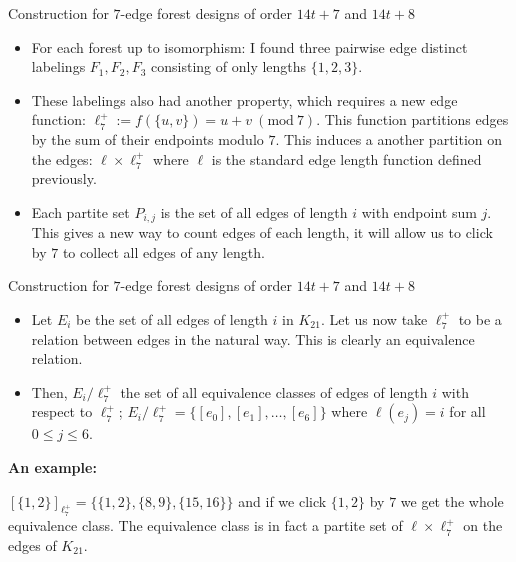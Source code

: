 \documentclass{beamer}
\theoremstyle{plain}
\newcommand{\Mod}[1]{\ (\mathrm{mod}\ #1)}
\begin{document}
    \begin{frame}{Construction for $7$-edge forest designs of order $14t+7$ and $14t+8$}

        \begin{itemize} 

        \item For each forest up to isomorphism: I found three pairwise edge distinct labelings $F_{1},F_{2},F_{3}$ consisting of only lengths $\{1,2,3\}$.
        \item These labelings also had another property, which requires a new edge function: $\ell^{+}_{7}:= f(\{u,v\})= u+v \Mod{7}$. This function partitions edges by the sum of their endpoints modulo $7$. This induces a another partition on the edges: $\ell\times \ell^{+}_{7}$ where $\ell$ is the standard edge length function defined previously.
        \item Each partite set $P_{i,j}$ is the set of all edges of length $i$ with endpoint sum $j$. This gives a new way to count edges of each length, it will allow us to click by $7$ to collect all edges of any length.
        
        \end{itemize}

    \end{frame}

\begin{frame}{Construction for $7$-edge forest designs of order $14t+7$ and $14t+8$}
    \begin{itemize}
    \item Let $E_{i}$ be the set of all edges of length $i$ in $K_{21}$. Let us now take $\ell^{+}_{7}$ to be a relation between edges in the natural way. This is clearly an equivalence relation. 
    \item Then, $E_{i}\slash \ell^{+}_{7}$ the set of all equivalence classes of edges of length $i$ with respect to $\ell^{+}_{7}$; $E_{i}\slash \ell^{+}_{7}=\{[e_{0}],[e_{1}],\hdots, [e_{6}]\}$ where $\ell(e_{j})=i$ for all $0\leq j\leq 6$.
    \end{itemize}

    \textbf{An example:}

        $[\{1,2\}]_{\ell^{+}_{7}}=\{\{1,2\},\{8,9\},\{15,16\}\}$ and if we click $\{1,2\}$ by $7$ we get the whole equivalence class. The equivalence class is in fact a partite set of $\ell\times \ell^{+}_{7}$ on the edges of $K_{21}$.
\end{frame}
\end{document}
